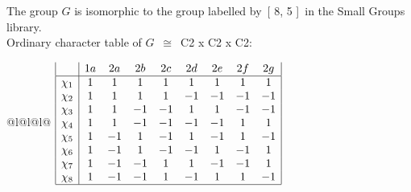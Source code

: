 \documentclass[varwidth=\maxdimen,border=10]{standalone}
\begin{document}
The group $G$ is isomorphic to the group labelled by\ [ 8, 5 ]\ in the Small Groups library.\\
Ordinary character table of $G$\ $\cong$\ C2 x C2 x C2:\\
\begin{center}
\begin{tabular}{@{}l@{}l@{}l@{}}
\hline
\(\begin{array}{|l|cccccccc|}
  & 1a & 2a & 2b & 2c & 2d & 2e & 2f & 2g\\ \hline
\chi_{1} & 1 & 1 & 1 & 1 & 1 & 1 & 1 & 1\\
\chi_{2} & 1 & 1 & 1 & 1 & -1 & -1 & -1 & -1\\
\chi_{3} & 1 & 1 & -1 & -1 & 1 & 1 & -1 & -1\\
\chi_{4} & 1 & 1 & -1 & -1 & -1 & -1 & 1 & 1\\
\chi_{5} & 1 & -1 & 1 & -1 & 1 & -1 & 1 & -1\\
\chi_{6} & 1 & -1 & 1 & -1 & -1 & 1 & -1 & 1\\
\chi_{7} & 1 & -1 & -1 & 1 & 1 & -1 & -1 & 1\\
\chi_{8} & 1 & -1 & -1 & 1 & -1 & 1 & 1 & -1\\
\hline
\end{array}\)\\
\end{tabular}
\end{center}
\end{document}
